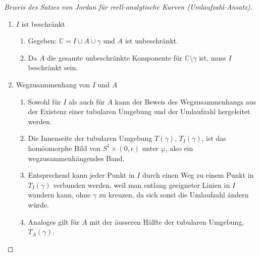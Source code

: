 \begin{proof}[Beweis des Satzes von Jordan für reell-analytische Kurven (Umlaufzahl-Ansatz)\label{jordan:proof:jordan_reell_analytische_kurven_umlaufzahl}]
\begin{enumerate}
\begin{enumerate}
        \end{enumerate}
        \item $I$ ist beschränkt \begin{enumerate}
                \item Gegeben: $\mathbb{C} = I \cup A \cup \gamma$ und $A$ ist unbeschränkt.
                \item Da $A$ die gesamte unbeschränkte Komponente für $\mathbb{C} \setminus \gamma$ ist, muss $I$ beschränkt sein.
        \end{enumerate}
        \item Wegzusammenhang von $I$ und $A$ \begin{enumerate}
            \item Sowohl für $I$ als auch für $A$ kann der Beweis des Wegzusammenhangs aus der Existenz einer tubularen Umgebung und der Umlaufzahl hergeleitet werden.
            \item Die Innenseite der tubularen Umgebung $T(\gamma)$, $T_{I}(\gamma)$, ist das homöomorphe Bild von $S^1 \times (0, \epsilon)$ unter $\varphi$, also ein wegzusammenhängendes Band.
            \item Entsprechend kann jeder Punkt in $I$ durch einen Weg zu einem Punkt in $T_{I}(\gamma)$ verbunden werden, weil man entlang geeigneter Linien in $I$ wandern kann, ohne $\gamma$ zu kreuzen, da sich sonst die Umlaufzahl ändern würde.
            \item Analoges gilt für $A$ mit der äusseren Hälfte der tubularen Umgebung, $T_{A}(\gamma)$.
        \end{enumerate}
    \end{enumerate}
\end{proof}